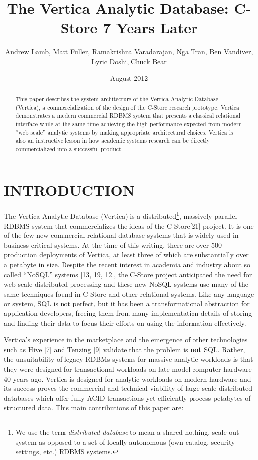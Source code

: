 \documentclass[a4paper,12pt,notitlepage,twoside,openright]{article}
\title{The Vertica Analytic Database: C-Store 7 Years Later}
\author{Andrew Lamb, Matt Fuller, Ramakrishna Varadarajan,
Nga Tran, Ben Vandiver, Lyric Doshi, Chuck Bear}
\date{August 2012}
\begin{document}
\maketitle

\begin{abstract}

This paper describes the system architecture of the Vertica Analytic
Database (Vertica), a commercialization of the design of the C-Store
research prototype. Vertica demonstrates a modern commercial RDBMS
system that presents a classical relational interface while at the same
time achieving the high performance expected from modern ``web scale''
analytic systems by making appropriate architectural choices. Vertica is
also an instructive lesson in how academic systems research can be
directly commercialized into a successful product.

\end{abstract}

\hypertarget{introduction}{%
\section{INTRODUCTION}\label{introduction}}

The Vertica Analytic Database (Vertica) is a distributed\footnote{We use
  the term \emph{distributed database} to mean a shared-nothing,
  scale-out system as opposed to a set of locally autonomous (own
  catalog, security settings, etc.) RDBMS systems.}, massively parallel
RDBMS system that commercializes the ideas of the C-Store{[}21{]}
project. It is one of the few new commercial relational database systems
that is widely used in business critical systems. At the time of this
writing, there are over 500 production deployments of Vertica, at least
three of which are substantially over a petabyte in size. Despite the
recent interest in academia and industry about so called ``NoSQL''
systems {[}13, 19, 12{]}, the C-Store project anticipated the need for
web scale distributed processing and these new NoSQL systems use many of
the same techniques found in C-Store and other relational systems. Like
any language or system, SQL is not perfect, but it has been a
transformational abstraction for application developers, freeing them
from many implementation details of storing and finding their data to
focus their efforts on using the information effectively.

Vertica's experience in the marketplace and the emergence of other
technologies such as Hive {[}7{]} and Tenzing {[}9{]} validate that the
problem is \textbf{not} SQL. Rather, the unsuitability of legacy RDBMs
systems for massive analytic workloads is that they were designed for
transactional workloads on late-model computer hardware 40 years ago.
Vertica is designed for analytic workloads on modern hardware and its
success proves the commercial and technical viability of large scale
distributed databases which offer fully ACID transactions yet
efficiently process petabytes of structured data. This main
contributions of this paper are:
\end{document}
